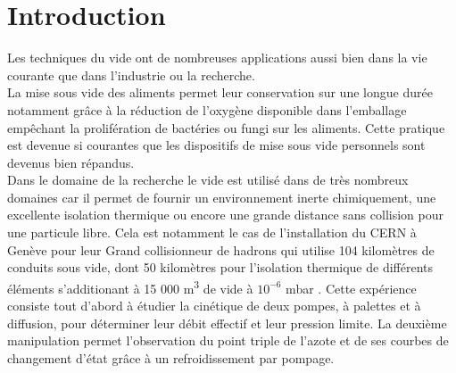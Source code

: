\section{Introduction}


Les techniques du vide ont de nombreuses applications aussi bien dans la vie courante que dans l'industrie ou la recherche. \\
La mise sous vide des aliments permet leur conservation sur une longue durée notamment grâce à la réduction de l'oxygène disponible dans l'emballage empêchant la prolifération de bactéries ou fungi sur les aliments. Cette pratique est devenue si courantes que les dispositifs de mise sous vide personnels sont devenus bien répandus. \\
Dans le domaine de la recherche le vide est utilisé dans de très nombreux domaines car il permet de fournir un environnement inerte chimiquement, une excellente isolation thermique ou encore une grande distance sans collision pour une particule libre. Cela est notamment le cas de l'installation du CERN à Genève pour leur Grand collisionneur de hadrons qui utilise 104 kilomètres de conduits sous vide, dont 50 kilomètres pour l'isolation thermique de différents éléments s'additionant à 15 000 \si{\cubic \meter} de vide à \(10^{-6}\) \si{\milli \bar} \cite{CERN}.
Cette expérience consiste tout d'abord à étudier la cinétique de deux pompes, à palettes et à diffusion, pour déterminer leur débit effectif et leur pression limite. La deuxième manipulation permet l'observation du point triple de l'azote et de ses courbes de changement d'état grâce à un refroidissement par pompage.

